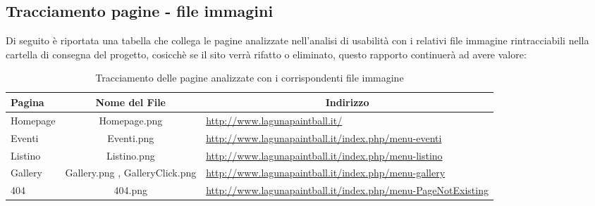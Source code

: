 \documentclass[../Relazione.tex]{subfiles}
\begin{document}
\newpage
		\subsection{Tracciamento pagine - file immagini}
		Di seguito è riportata una tabella che collega le pagine analizzate nell'analisi di usabilità con i relativi file immagine rintracciabili nella cartella di consegna del progetto, cosicchè se il sito verrà rifatto o eliminato, questo rapporto continuerà ad avere valore:

		\begin{table} [h]
		\centering
		\begin{tabularx}{\textwidth}{lcX}
			\toprule
			\textbf{Pagina} & {\textbf{Nome del File}} & \multicolumn{1}{c}{\textbf{Indirizzo}} \\
			\toprule
			Homepage & Homepage.png & \url{http://www.lagunapaintball.it/} \\
			\midrule
			Eventi & Eventi.png & \url{http://www.lagunapaintball.it/index.php/menu-eventi} \\
			\midrule
			Listino & Listino.png & \url{http://www.lagunapaintball.it/index.php/menu-listino} \\
			\midrule
			Gallery & Gallery.png , GalleryClick.png & \url{http://www.lagunapaintball.it/index.php/menu-gallery} \\
			\midrule
			404 & 404.png & \url{http://www.lagunapaintball.it/index.php/menu-PageNotExisting} \\
			\midrule
		\end{tabularx}
		\caption{Tracciamento delle pagine analizzate con i corrispondenti file immagine}
		\label{tab:tracciamento}
	\end{table}
\end{document}
